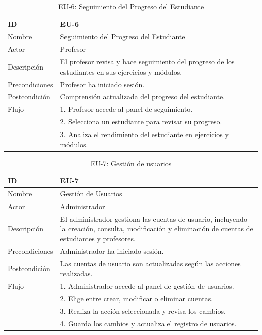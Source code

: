\begin{table}[H]
    \centering
    \begin{tabularx}{\textwidth}{|l|X|}
    \hline
    ID & EU-6 \\
    \hline
    Nombre & Seguimiento del Progreso del Estudiante \\
    \hline
    Actor & Profesor \\
    \hline
    Descripción & El profesor revisa y hace seguimiento del progreso de los estudiantes en sus ejercicios y módulos. \\
    \hline
    Precondiciones & Profesor ha iniciado sesión. \\
    \hline
    Postcondición & Comprensión actualizada del progreso del estudiante. \\
    \hline
    Flujo & 
    1. Profesor accede al panel de seguimiento. \\
    & 2. Selecciona un estudiante para revisar su progreso. \\
    & 3. Analiza el rendimiento del estudiante en ejercicios y módulos. \\
    \hline
    \end{tabularx}
    \caption{EU-6: Seguimiento del Progreso del Estudiante}
\end{table}

\begin{table}[H]
    \centering
    \begin{tabularx}{\textwidth}{|l|X|}
    \hline
    ID & EU-7 \\
    \hline
    Nombre &  Gestión de Usuarios \\
    \hline
    Actor & Administrador \\
    \hline
    Descripción & El administrador gestiona las cuentas de usuario, incluyendo la creación, consulta, modificación y eliminación de cuentas de estudiantes y profesores. \\
    \hline
    Precondiciones & Administrador ha iniciado sesión. \\
    \hline
    Postcondición &  Las cuentas de usuario son actualizadas según las acciones realizadas. \\
    \hline
    Flujo & 
    1. Administrador accede al panel de gestión de usuarios. \\
    & 2. Elige entre crear, modificar o eliminar cuentas. \\
    & 3. Realiza la acción seleccionada y revisa los cambios. \\
    & 4. Guarda los cambios y actualiza el registro de usuarios. \\
    \hline
    \end{tabularx}
    \caption{EU-7: Gestión de usuarios}
\end{table}

